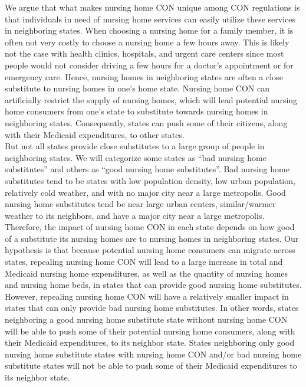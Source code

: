 \documentclass[../Main.tex]{subfiles}
\begin{document}
\indent We argue that what makes nursing home CON unique among CON regulations is that individuals in need of nursing home services can easily utilize these services in neighboring states. When choosing a nursing home for a family member, it is often not very costly to choose a nursing home a few hours away. This is likely not the case with health clinics, hospitals, and urgent care centers since most people would not consider driving a few hours for a doctor’s appointment or for emergency care. Hence, nursing homes in neighboring states are often a close substitute to nursing homes in one’s home state. Nursing home CON can artificially restrict the supply of nursing homes, which will lead potential nursing home consumers from one’s state to substitute towards nursing homes in neighboring states. Consequently, states can push some of their citizens, along with their Medicaid expenditures, to other states.\\
\indent But not all states provide close substitutes to a large group of people in neighboring states. We will categorize some states as “bad nursing home substitutes” and others as “good nursing home substitutes”. Bad nursing home substitutes tend to be states with low population density, low urban population, relatively cold weather, and with no major city near a large metropolis. Good nursing home substitutes tend be near large urban centers, similar/warmer weather to its neighbors, and have a major city near a large metropolis. Therefore, the impact of nursing home CON in each state depends on how good of a substitute its nursing homes are to nursing homes in neighboring states. Our hypothesis is that because potential nursing home consumers can migrate across states, repealing nursing home CON will lead to a large increase in total and Medicaid nursing home expenditures, as well as the quantity of nursing homes and nursing home beds, in states that can provide good nursing home substitutes. However, repealing nursing home CON will have a relatively smaller impact in states that can only provide bad nursing home substitutes. In other words, states neighboring a good nursing home substitute state without nursing home CON will be able to push some of their potential nursing home consumers, along with their Medicaid expenditures, to its neighbor state. States neighboring only good nursing home substitute states with nursing home CON and/or bad nursing home substitute states will not be able to push some of their Medicaid expenditures to its neighbor state.  \\
\end{document}
